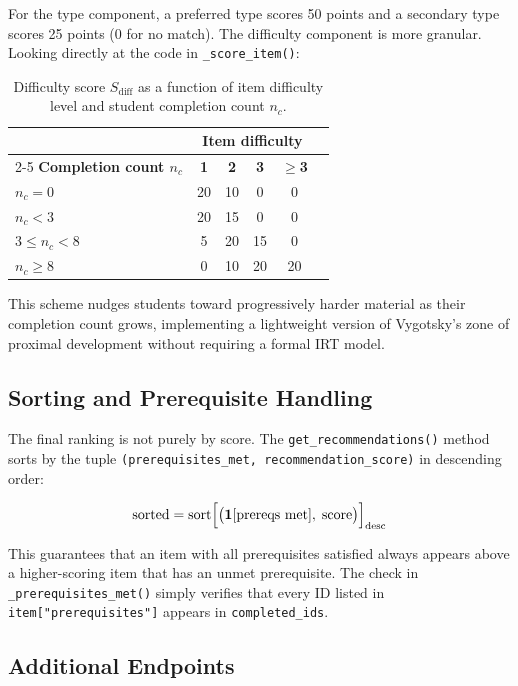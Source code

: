 \documentclass[12pt,a4paper]{article}
\begin{document}
For the type component, a preferred type scores 50 points and a
secondary type scores 25 points (0 for no match). The difficulty
component is more granular. Looking directly at the code in
\texttt{\_score\_item()}:

\begin{table}[H]
  \centering
  \caption{Difficulty score $S_{\text{diff}}$ as a function of
           item difficulty level and student completion count $n_c$.}
  \begin{tabular}{lccccc}
    \toprule
    & \multicolumn{4}{c}{\textbf{Item difficulty}} \\
    \cmidrule(lr){2-5}
    \textbf{Completion count $n_c$} & \textbf{1} & \textbf{2} & \textbf{3} & \textbf{$\ge$3} \\
    \midrule
    $n_c = 0$    & 20 & 10 & 0  & 0 \\
    $n_c < 3$    & 20 & 15 & 0  & 0 \\
    $3 \le n_c < 8$ & 5  & 20 & 15 & 0 \\
    $n_c \ge 8$  & 0  & 10 & 20 & 20 \\
    \bottomrule
  \end{tabular}
\end{table}

This scheme nudges students toward progressively harder material as
their completion count grows, implementing a lightweight version of
Vygotsky's zone of proximal development \cite{vygotsky1978} without
requiring a formal IRT model.

\subsection{Sorting and Prerequisite Handling}

The final ranking is not purely by score. The \texttt{get\_recommendations()}
method sorts by the tuple \texttt{(prerequisites\_met, recommendation\_score)}
in descending order:

\[
  \text{sorted} = \text{sort}
  \Bigl[\bigl(\mathbf{1}[\text{prereqs met}],\;
  \text{score}\bigr)\Bigr]_{\text{desc}}
\]

This guarantees that an item with all prerequisites satisfied always
appears above a higher-scoring item that has an unmet prerequisite.
The check in \texttt{\_prerequisites\_met()} simply verifies that
every ID listed in \texttt{item["prerequisites"]} appears in
\texttt{completed\_ids}.

\subsection{Additional Endpoints}
\end{document}
